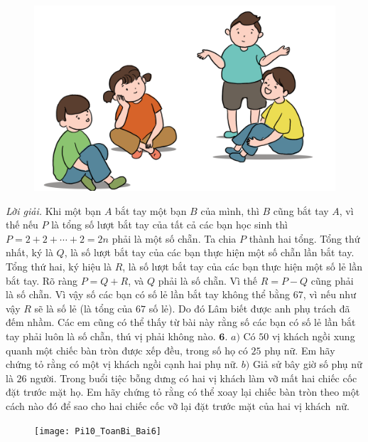 \begin{multicols}{2}
\begin{figure}[H]
		\centering
		\vspace*{-10pt}
		\captionsetup{labelformat= empty, justification=centering}
		\includegraphics[width=0.9\linewidth]{Pi10_ToanBi_Bai5}
		\vspace*{-10pt}
	\end{figure}
	\textit{Lời giải.} 	Khi một bạn $A$ bắt tay một bạn $B$ của mình, thì $B$ cũng bắt tay $A$, vì thế nếu $P$ là tổng số lượt bắt tay của tất cả các bạn học sinh thì $P= 2+2+\cdots+2=2n$ phải là một số chẵn.
	\vskip 0.1cm
	Ta chia $P$ thành hai tổng. Tổng thứ nhất, ký là $Q$, là số lượt bắt tay của các bạn thực hiện một số chẵn lần bắt tay. Tổng thứ hai, ký hiệu là $R$, là số lượt bắt tay của các bạn thực hiện một số lẻ lần bắt tay. Rõ ràng $P= Q+R$, và $Q$ phải là số chẵn. Vì thế $R = P - Q$ cũng phải là số chẵn. Vì vậy số các bạn có số lẻ lần bắt tay không thể bằng $67$, vì nếu như vậy $R$ sẽ là số lẻ (là tổng của $67$ số lẻ). Do đó Lâm biết được anh phụ trách đã đếm nhầm. Các em cũng có thể thấy từ bài này rằng số các bạn có số lẻ lần bắt tay phải luôn là số chẵn, thú vị phải không nào.
	 \vskip 0.1cm
	$\pmb{6.}$ $a)$  Có $50$ vị khách ngồi xung quanh một chiếc bàn tròn được xếp đều, trong số họ có $25$ phụ nữ. Em hãy chứng tỏ rằng có một vị khách ngồi cạnh hai phụ nữ.
	\vskip 0.1cm
	$b)$ Giả sử bây giờ số phụ nữ là $26$ người. Trong buổi tiệc bỗng dưng có hai vị khách làm vỡ mất hai chiếc cốc đặt trước mặt họ. Em hãy chứng tỏ rằng có thể xoay lại chiếc bàn tròn theo một cách nào đó để sao cho hai chiếc cốc vỡ lại đặt trước mặt của hai vị khách~nữ.
	\begin{figure}[H]
		\centering
		\vspace*{-10pt}
		\captionsetup{labelformat= empty, justification=centering}
		\texttt{[image: Pi10\_ToanBi\_Bai6]}
		\vspace*{-10pt}
	\end{figure}

\end{multicols}
